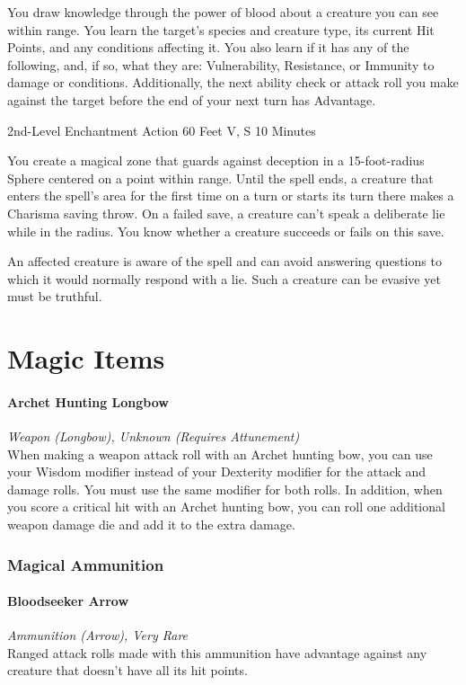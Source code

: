 \documentclass[letterpaper,openany,oneside,twocolumn]{book}
\begin{document}
You draw knowledge through the power of blood about a creature you can see within range. You learn the target's species and creature type, its current Hit Points, and any conditions affecting it. You also learn if it has any of the following, and, if so, what they are: Vulnerability, Resistance, or Immunity to damage or conditions. Additionally, the next ability check or attack roll you make against the target before the end of your next turn has Advantage.

	{2nd-Level Enchantment}
	{Action}
	{60 Feet}
	{V, S}
	{10 Minutes}

You create a magical zone that guards against deception in a 15-foot-radius Sphere centered on a point within range. Until the spell ends, a creature that enters the spell's area for the first time on a turn or starts its turn there makes a Charisma saving throw. On a failed save, a creature can't speak a deliberate lie while in the radius. You know whether a creature succeeds or fails on this save.

An affected creature is aware of the spell and can avoid answering questions to which it would normally respond with a lie. Such a creature can be evasive yet must be truthful.

\part*{Magic Items}
\subsection*{Archet Hunting Longbow}
\textit{Weapon (Longbow), Unknown (Requires Attunement)}\\
{\entryfont When making a weapon attack roll with an Archet hunting bow, you can use your Wisdom modifier instead of your Dexterity modifier for the attack and damage rolls. You must use the same modifier for both rolls. In addition, when you score a critical hit with an Archet hunting bow, you can roll one additional weapon damage die and add it to the extra damage.}
\vfill\eject
\section*{Magical Ammunition}
\subsection*{Bloodseeker Arrow}
\textit{Ammunition (Arrow), Very Rare}\\
Ranged attack rolls made with this ammunition have advantage against any creature that doesn't have all its hit points.
\end{document}
